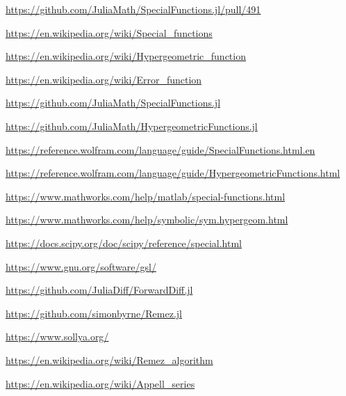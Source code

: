 \documentclass{article}
\theoremstyle{mytheoremstyle}
\theoremstyle{mytheoremstyle}
\theoremstyle{myproblemstyle}
\begin{document}
    \begin{thebibliography}{9}
      \url{https://github.com/JuliaMath/SpecialFunctions.jl/pull/491}

      \url{https://en.wikipedia.org/wiki/Special_functions}  

      \url{https://en.wikipedia.org/wiki/Hypergeometric_function}

      \url{https://en.wikipedia.org/wiki/Error_function}

      \url{https://github.com/JuliaMath/SpecialFunctions.jl}

      \url{https://github.com/JuliaMath/HypergeometricFunctions.jl}

      \url{https://reference.wolfram.com/language/guide/SpecialFunctions.html.en}

      \url{https://reference.wolfram.com/language/guide/HypergeometricFunctions.html}

      \url{https://www.mathworks.com/help/matlab/special-functions.html}

      \url{https://www.mathworks.com/help/symbolic/sym.hypergeom.html}

      \url{https://docs.scipy.org/doc/scipy/reference/special.html}

      \url{https://www.gnu.org/software/gsl/}

      \url{https://github.com/JuliaDiff/ForwardDiff.jl}

      \url{https://github.com/simonbyrne/Remez.jl}

      \url{https://www.sollya.org/}

      \url{https://en.wikipedia.org/wiki/Remez_algorithm}

      \url{https://en.wikipedia.org/wiki/Appell_series}
    \end{thebibliography}
  
\end{document}
